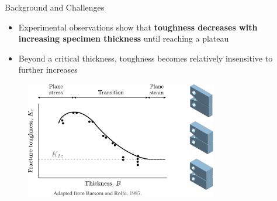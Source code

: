 \documentclass[9pt]{beamer}
\begin{document}
\begin{frame}{Background and Challenges}

\begin{itemize}
    \item Experimental observations show that \textbf{toughness decreases with increasing specimen thickness} until reaching a plateau
    \vspace{0.15cm}
    \item Beyond a critical thickness, toughness becomes relatively insensitive to further increases
\end{itemize}

\begin{figure}
    \centering
    \includegraphics[width=0.75\textwidth]{Images/plateau_plane_strain.pdf}
\end{figure}


\end{frame}

\end{document}
